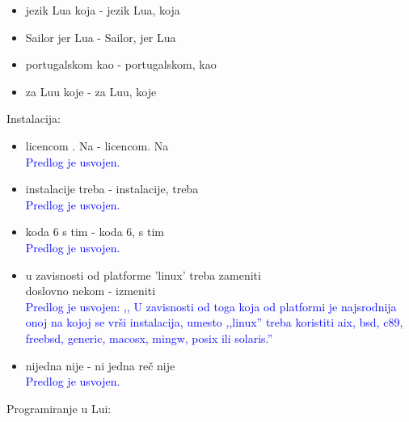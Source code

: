 \documentclass[a4paper]{report}
\newcommand{\odgovorAutora}[1]{\textcolor{blue}{#1}}
\begin{document}
\begin{itemize}
  \item jezik Lua koja - jezik Lua, koja 
  \item Sailor jer Lua - Sailor, jer Lua 
  \item portugalskom kao - portugalskom, kao  
  \item  za Luu koje -  za Luu, koje
\end{itemize}
Instalacija:
\begin{itemize}
  \item licencom . Na - licencom. Na \\
  \odgovorAutora{Predlog je usvojen.}
  \item instalacije treba  - instalacije, treba \\
  \odgovorAutora{Predlog je usvojen.} 
  \item  koda 6 s tim -  koda 6, s tim \\
  \odgovorAutora{Predlog je usvojen.}
  \item  u zavisnosti od platforme ’linux’ treba zameniti \\ doslovno nekom - izmeniti \\
  \odgovorAutora{Predlog je usvojen: ,, U zavisnosti od toga koja od platformi je najsrodnija onoj na kojoj se vrši instalacija, umesto ,,linux'' treba koristiti aix, bsd, c89, freebsd, generic, macosx, mingw, posix ili solaris.''}
  \item  nijedna nije - ni jedna reč nije \\
  \odgovorAutora{Predlog je usvojen.}
\end{itemize}
Programiranje u Lui: 
\end{document}
